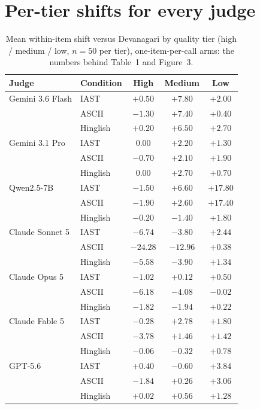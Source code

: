 \section{Per-tier shifts for every judge}
\label{app:tiers}

\begin{table}[H]
\centering\small
\caption{Mean within-item shift versus Devanagari by quality tier (high / medium / low, $n{=}50$ per tier), one-item-per-call arms: the numbers behind Table~1 and Figure~3.}
\begin{tabular}{llccc}
\toprule
Judge & Condition & High & Medium & Low \\
\midrule
Gemini 3.6 Flash & IAST & $+0.50$ & $+7.80$ & $+2.00$ \\
 & ASCII & $-1.30$ & $+7.40$ & $+0.40$ \\
 & Hinglish & $+0.20$ & $+6.50$ & $+2.70$ \\
Gemini 3.1 Pro & IAST & $0.00$ & $+2.20$ & $+1.30$ \\
 & ASCII & $-0.70$ & $+2.10$ & $+1.90$ \\
 & Hinglish & $0.00$ & $+2.70$ & $+0.70$ \\
Qwen2.5-7B & IAST & $-1.50$ & $+6.60$ & $+17.80$ \\
 & ASCII & $-1.90$ & $+2.60$ & $+17.40$ \\
 & Hinglish & $-0.20$ & $-1.40$ & $+1.80$ \\
Claude Sonnet 5 & IAST & $-6.74$ & $-3.80$ & $+2.44$ \\
 & ASCII & $-24.28$ & $-12.96$ & $+0.38$ \\
 & Hinglish & $-5.58$ & $-3.90$ & $+1.34$ \\
Claude Opus 5 & IAST & $-1.02$ & $+0.12$ & $+0.50$ \\
 & ASCII & $-6.18$ & $-4.08$ & $-0.02$ \\
 & Hinglish & $-1.82$ & $-1.94$ & $+0.22$ \\
Claude Fable 5 & IAST & $-0.28$ & $+2.78$ & $+1.80$ \\
 & ASCII & $-3.78$ & $+1.46$ & $+1.42$ \\
 & Hinglish & $-0.06$ & $-0.32$ & $+0.78$ \\
GPT-5.6 & IAST & $+0.40$ & $-0.60$ & $+3.84$ \\
 & ASCII & $-1.84$ & $+0.26$ & $+3.06$ \\
 & Hinglish & $+0.02$ & $+0.56$ & $+1.28$ \\
\bottomrule
\end{tabular}
\end{table}

